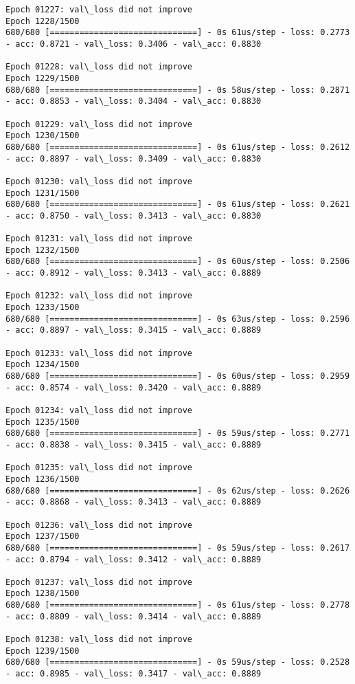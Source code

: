 \documentclass[11pt]{article}
\begin{document}
\begin{Verbatim}[commandchars=\\\{\}]
Epoch 01227: val\_loss did not improve
Epoch 1228/1500
680/680 [==============================] - 0s 61us/step - loss: 0.2773 - acc: 0.8721 - val\_loss: 0.3406 - val\_acc: 0.8830

Epoch 01228: val\_loss did not improve
Epoch 1229/1500
680/680 [==============================] - 0s 58us/step - loss: 0.2871 - acc: 0.8853 - val\_loss: 0.3404 - val\_acc: 0.8830

Epoch 01229: val\_loss did not improve
Epoch 1230/1500
680/680 [==============================] - 0s 61us/step - loss: 0.2612 - acc: 0.8897 - val\_loss: 0.3409 - val\_acc: 0.8830

Epoch 01230: val\_loss did not improve
Epoch 1231/1500
680/680 [==============================] - 0s 61us/step - loss: 0.2621 - acc: 0.8750 - val\_loss: 0.3413 - val\_acc: 0.8830

Epoch 01231: val\_loss did not improve
Epoch 1232/1500
680/680 [==============================] - 0s 60us/step - loss: 0.2506 - acc: 0.8912 - val\_loss: 0.3413 - val\_acc: 0.8889

Epoch 01232: val\_loss did not improve
Epoch 1233/1500
680/680 [==============================] - 0s 63us/step - loss: 0.2596 - acc: 0.8897 - val\_loss: 0.3415 - val\_acc: 0.8889

Epoch 01233: val\_loss did not improve
Epoch 1234/1500
680/680 [==============================] - 0s 60us/step - loss: 0.2959 - acc: 0.8574 - val\_loss: 0.3420 - val\_acc: 0.8889

Epoch 01234: val\_loss did not improve
Epoch 1235/1500
680/680 [==============================] - 0s 59us/step - loss: 0.2771 - acc: 0.8838 - val\_loss: 0.3415 - val\_acc: 0.8889

Epoch 01235: val\_loss did not improve
Epoch 1236/1500
680/680 [==============================] - 0s 62us/step - loss: 0.2626 - acc: 0.8868 - val\_loss: 0.3413 - val\_acc: 0.8889

Epoch 01236: val\_loss did not improve
Epoch 1237/1500
680/680 [==============================] - 0s 59us/step - loss: 0.2617 - acc: 0.8794 - val\_loss: 0.3412 - val\_acc: 0.8889

Epoch 01237: val\_loss did not improve
Epoch 1238/1500
680/680 [==============================] - 0s 61us/step - loss: 0.2778 - acc: 0.8809 - val\_loss: 0.3414 - val\_acc: 0.8889

Epoch 01238: val\_loss did not improve
Epoch 1239/1500
680/680 [==============================] - 0s 59us/step - loss: 0.2528 - acc: 0.8985 - val\_loss: 0.3417 - val\_acc: 0.8889


\end{Verbatim}
\end{document}
